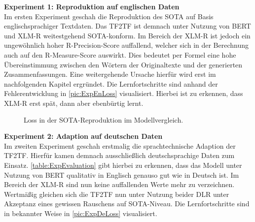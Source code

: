\noindent
\textbf{Experiment 1: Reproduktion auf englischen Daten}\\
\noindent
Im ersten Experiment geschah die Reproduktion des \ac{SOTA} auf Basis englischsprachiger Textdaten. Das \ac{TF2TF} ist demnach unter Nutzung von \ac{BERT} und \ac{XLM-R} weitestgehend \ac{SOTA}-konform. Im Bereich der \ac{XLM-R} ist jedoch ein ungewöhnlich hoher R-Precision-Score auffallend, welcher sich in der Berechnung auch auf den R-Measure-Score auswirkt. Dies bedeutet per Formel eine hohe Übereinstimmung zwischen den Wörtern der Originaltexte und der generierten Zusammenfassungen. Eine weitergehende Ursache hierfür wird erst im nachfolgenden Kapitel ergründet. Die Lernfortschritte sind anhand der Fehlerentwicklung in \autoref{pic:ExpEnLoss} visualisiert. Hierbei ist zu erkennen, dass \ac{XLM-R} erst spät, dann aber ebenbürtig lernt.\\

\begin{figure}[h]
  \centering
  \caption{Loss in der SOTA-Reproduktion im Modellvergleich.}
  \label{pic:ExpEnLoss}
\end{figure}

\noindent
\textbf{Experiment 2: Adaption auf deutschen Daten}\\
\noindent
Im zweiten Experiment geschah erstmalig die sprachtechnische Adaption der \ac{TF2TF}. Hierfür kamen demnach ausschließlich deutschsprachige Daten zum Einsatz. \autoref{table:ExpEvaluation} gibt hierbei zu erkennen, dass das Modell unter Nutzung von \ac{BERT} qualitativ in Englisch genauso gut wie in Deutsch ist. Im Bereich der \ac{XLM-R} sind nun keine auffallenden Werte mehr zu verzeichnen. Wertmäßig gleichen sich die \ac{TF2TF} nun unter Nutzung beider \ac{DLR} unter Akzeptanz eines gewissen Rauschens auf \ac{SOTA}-Niveau. Die Lernfortschritte sind in bekannter Weise in \autoref{pic:ExpDeLoss} visualisiert.
\newpage

